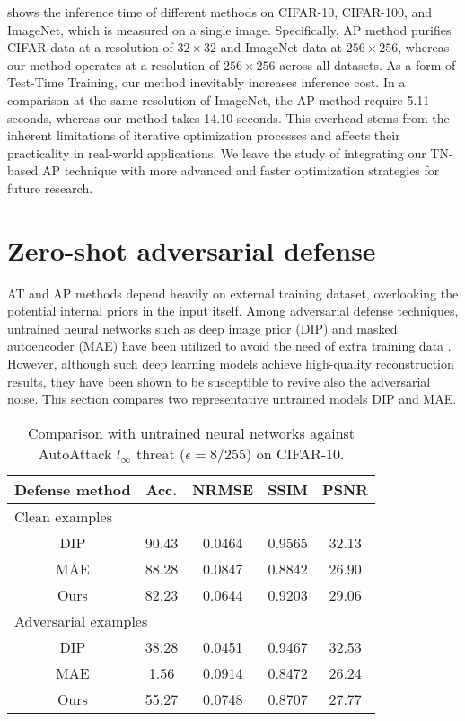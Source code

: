  shows the inference time of different methods on CIFAR-10, CIFAR-100, and ImageNet, which is measured on a single image. Specifically, AP method purifies CIFAR data at a resolution of $32 \times 32$ and ImageNet data at $256 \times 256$, whereas our method operates at a resolution of $256 \times 256$ across all datasets. As a form of Test-Time Training, our method inevitably increases inference cost. In a comparison at the same resolution of ImageNet, the AP method require 5.11 seconds, whereas our method takes 14.10 seconds. This overhead stems from the inherent limitations of iterative optimization processes and affects their practicality in real-world applications. We leave the study of integrating our TN-based AP technique with more advanced and faster optimization strategies for future research.


\section{Zero-shot adversarial defense}

AT and AP methods depend heavily on external training dataset, overlooking the
potential internal priors in the input itself.
Among adversarial defense techniques, untrained neural networks such
as deep image prior (DIP) \cite{ulyanov2018deep} and masked autoencoder (MAE) \cite{he2022masked} have been
utilized to avoid the need of extra training data \cite{dipdefend2020,dai2022deep,lyu2023maedefense}.
However, although such deep learning models achieve high-quality reconstruction results,
they have been shown to be susceptible to revive also the adversarial noise.
This section compares two representative untrained models DIP and MAE.

\begin{table}[h]
    \caption{Comparison with untrained neural networks against AutoAttack $l_\infty$ threat ($\epsilon=8/255$) on CIFAR-10.}
    \vskip 0.15in
    \label{tab:trainingfree}
    \begin{center}
    \begin{tabular}{ccccc}
    \toprule
    Defense method & Acc. & NRMSE & SSIM & PSNR  \\
    \midrule
    \multicolumn{5}{l}{Clean examples} \\
    \midrule
    DIP & 90.43 & 0.0464 & 0.9565 & 32.13 \\
    MAE & 88.28 & 0.0847 & 0.8842 & 26.90  \\
    Ours & 82.23 & 0.0644 & 0.9203 & 29.06 \\
    \midrule
    \multicolumn{5}{l}{Adversarial examples} \\
    \midrule
    DIP & 38.28 & 0.0451 & 0.9467 & 32.53  \\
    MAE & 1.56 & 0.0914 & 0.8472 & 26.24  \\
    Ours & 55.27 & 0.0748 & 0.8707 & 27.77 \\
    \bottomrule
    \bottomrule
    \end{tabular}
    \end{center}
    \vskip -0.1in
\end{table}

